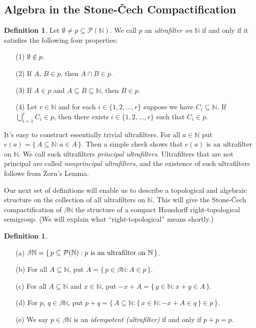 \documentclass[12pt]{article}
\theoremstyle{plain}
\theoremstyle{definition}
\newtheorem{defn}[thm]{Definition}
\newcommand{\bbN}{\mathbb{N}}
\begin{document}
\subsection{Algebra in the Stone-\v{C}ech Compactification}
\begin{defn}
  \label{defn:uf}
  Let $\emptyset \ne p \subseteq \mathcal{P}(\bbN)$.
  We call $p$ an \textsl{ultrafilter on $\bbN$} if and only if it
  satisfies the following four properties:
    \begin{itemize}
      \item[(1)] $\emptyset \not\in p$.
      \item[(2)] If $A$, $B \in p$, then $A \cap B \in p$.
      \item[(3)] If $A \in p$ and $A \subseteq B \subseteq \bbN$,
        then $B \in p$.
      \item[(4)] Let $r \in \bbN$ and for each $i \in \{1, 2,
        \ldots, r\}$ suppose we have $C_i \subseteq \bbN$. 
        If $\bigcup_{i=1}^r C_i \in p$, then there exists $i \in
        \{1, 2, \ldots, r\}$ such that $C_i \in p$.
    \end{itemize}
\end{defn}
  
It's easy to construct essentially trivial ultrafilters. 
For all $a \in \bbN$ put $e(a) = \{\, A \subseteq \bbN : a \in A
\,\}$.
Then a simple check shows that $e(a)$ is an ultrafilter on $\bbN$.
We call such ultrafilters \textsl{principal ultrafilters}. 
Ultrafilters that are not principal are called \textsl{nonprincipal
  ultrafilters}, and the existence of such ultrafilters follows from
Zorn's Lemma. 

Our next set of definitions will enable us to describe a topological
and algebraic structure on the collection of all ultrafilters on $\bbN$.
This will give the Stone-\v{C}ech compactification of $\beta\bbN$ the
structure of a compact Hausdorff right-topological semigroup. 
(We will explain what ``right-topological'' means shortly.)

\begin{defn}
  \label{defn:alg}
  \begin{itemize}
    \item[(a)] $\beta\bbN = \{\, p \subseteq \mathcal{P}(\bbN) :
      \hbox{$p$ is an ultrafilter on
      $\bbN$} \,\}$.
    \item[(b)] For all $A \subseteq \bbN$, put $\overline{A} = \{\,
      p \in \beta\bbN : A \in p \,\}$.
    \item[(c)] For all $A \subseteq \bbN$ and $x \in \bbN$, put
      $-x+A = \{\, y \in \bbN : x+y \in A \,\}$.
    \item[(d)] For $p$, $q \in \beta\bbN$, put
      $p+q = \bigl\{\, A \subseteq \bbN : \{\, x \in \bbN : -x +A \in q
      \,\} \in p \,\bigr\}$.
    \item[(e)] We say $p \in \beta\bbN$ is an \textsl{idempotent
        (ultrafilter)} if  and only if $p + p = p$.
  \end{itemize}
\end{defn}
\end{document}
